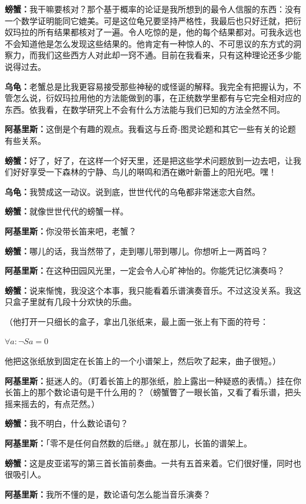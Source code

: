 \documentclass[
  12pt,
  twoside,
  openright,
  oldfontcommands,
]{memoir}
\newcommand{\kaitismall}[1]{{\kaitifamily\small #1}}
\newcommand{\dialogname}[1]{{\heifamily\bfseries #1}}
\begin{document}
\dialogname{螃蟹：}我干嘛要核对？那个基于概率的论证是我所想到的最令人信服的东西：没有一个数学证明能同它媲美。可是这位龟兄要坚持严格性，我最后也只好迁就，把衍奴玛拉的所有结果都核对了一遍。令人吃惊的是，他的每个结果都对。可我永远也不会知道他是怎么发现这些结果的。他肯定有一种惊人的、不可思议的东方式的洞察力，而我们这些西方人对此却一窍不通。目前在我看来，只有这种理论还多少能说得过去。

\dialogname{乌龟：}老蟹总是比我更容易接受那些神秘的或怪诞的解释。我完全有把握认为，不管怎么说，衍奴玛拉用他的方法能做到的事，在正统数学里都有与它完全相对应的东西。依我看，在数学研究上不会有什么方法能与我们已知的方法全然不同。

\dialogname{阿基里斯：}这倒是个有趣的观点。我看这与丘奇-图灵论题和其它一些有关的论题有些关系。

\dialogname{螃蟹：}好了，好了，在这样一个好天里，还是把这些学术问题放到一边去吧，让我们好好享受一下森林的宁静、鸟儿的啭鸣和洒在嫩叶新蕾上的阳光吧。嘿！

\dialogname{乌龟：}我赞成这一动议。说到底，世世代代的乌龟都非常迷恋大自然。

\dialogname{螃蟹：}就像世世代代的螃蟹一样。

\dialogname{阿基里斯：}你没带长笛来吧，老蟹？

\dialogname{螃蟹：}哪儿的话，我当然带了，走到哪儿带到哪儿。你想听上一两首吗？

\dialogname{阿基里斯：}在这种田园风光里，一定会令人心旷神怡的。你能凭记忆演奏吗？

\dialogname{螃蟹：}说来惭愧，我没这个本事，我只能看着乐谱演奏音乐。不过这没关系。我这只盒子里就有几段十分欢快的乐曲。

（他打开一只细长的盒子，拿出几张纸来，最上面一张上有下面的符号：

$\forall a:\lnot Sa=0$

他把这张纸放到固定在长笛上的一个小谱架上，然后吹了起来，曲子很短。）

\dialogname{阿基里斯：}挺迷人的。\kaitismall{（盯着长笛上的那张纸，脸上露出一种疑惑的表情。）}挂在你长笛上的那个数论语句是干什么用的？\kaitismall{（螃蟹瞥了一眼长笛，又看了看乐谱，把头摇来摇去的，有点茫然。）}

\dialogname{螃蟹：}我不明白，什么数论语句？

\dialogname{阿基里斯：}「零不是任何自然数的后继。」就在那儿，长笛的谱架上。

\dialogname{螃蟹：}这是皮亚诺写的第三首长笛前奏曲。一共有五首来着。它们很好懂，同时也很吸引人。

\dialogname{阿基里斯：}我所不懂的是，数论语句怎么能当音乐演奏？
\end{document}
